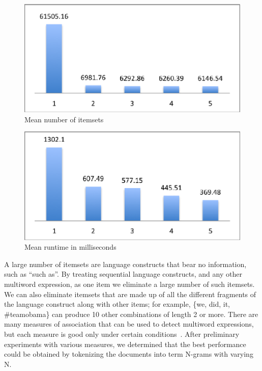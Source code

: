 \documentclass[letterpaper,12pt,titlepage,oneside,final]{book}
\begin{document}
\begin{figure}
\centering
\includegraphics{perf_ngramlen1-5_itemsets_supp10+_1hr.eps}
\caption{Mean number of itemsets}
\label{fig:ngramsLenB}
\end{figure}
\begin{figure}
\includegraphics{perf_ngramlen1-5_runtime-millis_supp10+_1hr.eps}
\caption{Mean runtime in milliseconds}
\label{fig:ngramsLenC}
\end{figure} 



A large number of itemsets are language constructs that bear no information,
such as ``such as''. 
By treating sequential language constructs, and any other multiword expression,
as one item we eliminate a large number of such itemsets.
We can also eliminate itemsets that are made up of all the different fragments
of the language construct along with other items;
for example, \{we, did, it, \#teamobama\} can produce 10 other combinations of
length 2 or more.
There are many measures of association that can be used to detect multiword
expressions, but each measure is good only under certain conditions~\cite{ramisch2012broad,tan2002selecting}.
After preliminary experiments with various measures, we determined that
the best performance
could be obtained by tokenizing the documents into term N-grams with varying N. 
\end{document}

